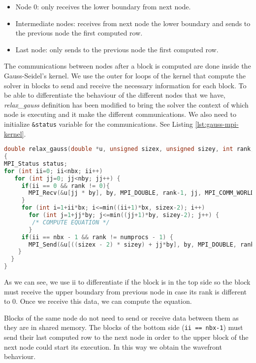 \documentclass[a4paper, 10pt]{article}
\begin{document}
\begin{itemize}
  \item Node 0: only receives the lower boundary from next node.
  \item Intermediate nodes: receives from next node the lower boundary and sends to the previous node the first computed row.
  \item Last node: only sends to the previous node the first computed row.
\end{itemize}


The communications between nodes after a block is computed are done inside the Gauss-Seidel's kernel. We use the outer for loops of the kernel that compute the solver in blocks to send and receive the necessary information for each block. To be able to differentiate the behaviour of the different nodes that we have, \textit{relax\_gauss} definition has been modified to bring the solver the context of which node is executing and it make the different communications. We also need to initialize \texttt{\&status} variable for the communications. See Listing \ref{lst:gauss-mpi-kernel}.

\begin{lstlisting}[language=c, caption={Communications between nodes Gauss-Seidel inside kernel}, label={lst:gauss-mpi-kernel}]
double relax_gauss(double *u, unsigned sizex, unsigned sizey, int rank, int numprocs) //rank and numprocs passed as parameters
{
MPI_Status status;
for (int ii=0; ii<nbx; ii++)
   for (int jj=0; jj<nby; jj++) {
     if(ii == 0 && rank != 0){
       MPI_Recv(&u[jj * by], by, MPI_DOUBLE, rank-1, jj, MPI_COMM_WORLD, &status);
     }
     for (int i=1+ii*bx; i<=min((ii+1)*bx, sizex-2); i++) 
       for (int j=1+jj*by; j<=min((jj+1)*by, sizey-2); j++) {
        /* COMPUTE EQUATION */
       }
     if(ii == nbx - 1 && rank != numprocs - 1) {
       MPI_Send(&u[((sizex - 2) * sizey) + jj*by], by, MPI_DOUBLE, rank+1, jj, MPI_COMM_WORLD);
    }
  } 
}
\end{lstlisting}

As we can see, we use ii to differentiate if the block is in the top side so the block must receive the upper boundary from previous node in case its rank is different to 0. Once we receive this data, we can compute the equation.

Blocks of the same node do not need to send or receive data between them as they are in shared memory. The blocks of the bottom side (\texttt{ii == nbx-1}) must send their last computed row to the next node in order to the upper block of the next node could start its execution. In this way we obtain the wavefront behaviour.
\end{document}
